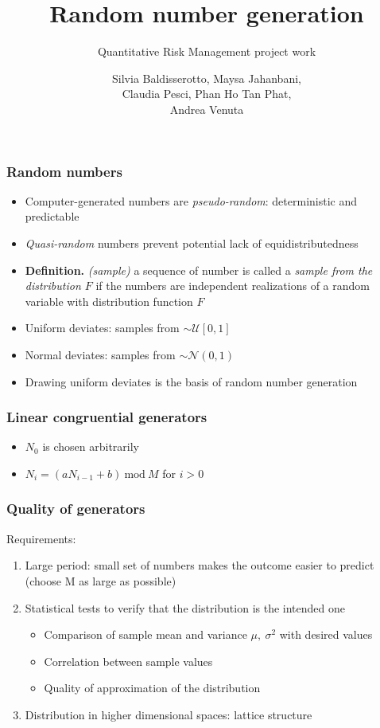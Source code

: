 \documentclass[10pt, compress]{beamer}
\title{Random number generation}
\subtitle{Quantitative Risk Management project work}
\date{}
\author{Silvia Baldisserotto, Maysa Jahanbani, \\ Claudia Pesci, Phan Ho Tan Phat, \\ Andrea Venuta}
\institute{Università degli Studi di Firenze - Finance and Risk Management}
\begin{document}
\maketitle

\begin{frame}[fragile]
  \frametitle{Random numbers}
  \begin{itemize}
  	\item Computer-generated numbers are \textit{pseudo-random}: deterministic and predictable
  	\item \textit{Quasi-random} numbers prevent potential lack of equidistributedness
  	\item \textbf{Definition.} \textit{(sample)} a sequence of number is called a \textit{sample from the distribution $F$}
  	  if the numbers are independent realizations of a random variable with distribution function $F$
	\item Uniform deviates: samples from $\sim \mathcal{U}  \left[ 0, 1 \right] $
	\item Normal deviates: samples from $\sim \mathcal{N}  \left( 0, 1 \right) $
	\item Drawing uniform deviates is the basis of random number generation
  \end{itemize}
\end{frame}

\begin{frame}[fragile]
  \frametitle{Linear congruential generators}
  	\begin{itemize}
  	  \item $N_0$ is chosen arbitrarily
  	  \item $N_i = (aN_{i-1} + b)\ \text{mod}\ M$ for $i > 0$
  	\end{itemize}
\end{frame}

\begin{frame}[fragile]
  \frametitle{Quality of generators}
  Requirements:
  \begin{enumerate}
  	\item Large period: small set of numbers makes the outcome easier to predict (choose M as large as possible)
  	\item Statistical tests to verify that the distribution is the intended one
  	  \begin{itemize}
  	  	\item Comparison of sample mean and variance $\mu,\ \sigma^2$ with desired values
  	  	\item Correlation between sample values
  	  	\item Quality of approximation of the distribution
  	  \end{itemize}
     \item Distribution in higher dimensional spaces: lattice structure
  \end{enumerate}
\end{frame}
\end{document}
